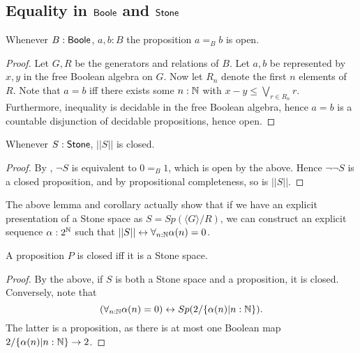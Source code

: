 \subsection{Equality in $\mathsf{Boole}$ and $\mathsf{Stone}$}
\begin{lemma}\label{BooleEqualityOpen}
  Whenever $B:\mathsf{Boole}$, $a,b:B$ the proposition $a=_Bb$ is open. 
\end{lemma}
\begin{proof}
  Let $G,R$ be the generators and relations of $B$. 
  Let $a,b$ be represented by $x,y$ in the free Boolean algebra on $G$. 
  Now let $R_n$ denote the first $n$ elements of $R$. 
  Note that $a=b$ iff there exists some $n:\mathbb{N}$ with $x-y \leq \bigvee_{r\in R_n} r$. 
  Furthermore, inequality is decidable in the free Boolean algebra, hence
  $a=b$ is a countable disjunction of decidable propositions, hence open. 
\end{proof}


\begin{corollary}\label{TruncationStoneClosed}
  Whenever $S:\mathsf{Stone}$, $||S||$ is closed. 
\end{corollary}
\begin{proof}
  By , $\neg S$ is equivalent to $0=_B 1$, which is open by the above. 
  Hence $\neg \neg S$ is a closed proposition, and by propositional completeness, so is $||S||$. 
\end{proof}

\begin{remark}\label{ExplicitTruncationStoneClosed}
  The above lemma and corollary actually show that if we have an explicit 
  presentation of a Stone space as $S = Sp(\langle G \rangle / R)$, 
  we can construct an explicit sequence $\alpha:2^{\mathbb{N}}$ such that $||S|| \leftrightarrow \forall_{n:\mathbb{N}} \alpha(n) = 0$. 
\end{remark}


\begin{corollary}\label{PropositionsClosedIffStone}
  A proposition $P$ is closed iff it is a Stone space. 
\end{corollary}
\begin{proof}
  By the above, if $S$ is both a Stone space and a proposition, it is closed. 
  Conversely, note that 
  $$
  (\forall_{n:\mathbb{N}} \alpha(n) = 0 )\leftrightarrow Sp(2/\{\alpha(n)| n:\mathbb{N}\}).
  $$
  The latter is a proposition, as there is at most one Boolean map $2/\{\alpha(n)|n:\mathbb{N}\} \to 2$.
\end{proof}

